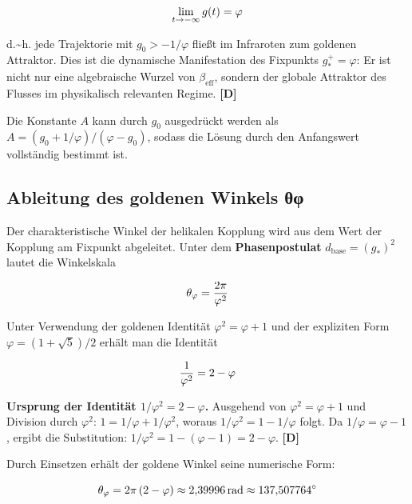 ﻿\documentclass[11pt,letterpaper]{article}
\begin{document}
\begin{equation*}
  \resizebox{\ifdim\width>\linewidth \linewidth\else\width\fi}{!}{$\displaystyle \lim_{t \to -\infty} g(t) = \varphi$}
\end{equation*}

d.\textasciitilde{}h. jede Trajektorie mit $g_0 > -1/\varphi$ fließt im Infraroten zum goldenen Attraktor. Dies ist die dynamische Manifestation des Fixpunkts $g_*^+ = \varphi$: Er ist nicht nur eine algebraische Wurzel von $\beta_{\text{eff}}$, sondern der globale Attraktor des Flusses im physikalisch relevanten Regime. \textbf{[D]}

Die Konstante $A$ kann durch $g_0$ ausgedrückt werden als $A = (g_0 + 1/\varphi)/(\varphi - g_0)$, sodass die Lösung durch den Anfangswert vollständig bestimmt ist.
\subsection{Ableitung des goldenen Winkels θφ}
Der charakteristische Winkel der helikalen Kopplung wird aus dem Wert der Kopplung am Fixpunkt abgeleitet. Unter dem \textbf{Phasenpostulat} $d_{\text{base}} = (g_*)^2$ lautet die Winkelskala

\begin{equation*}
  \resizebox{\ifdim\width>\linewidth \linewidth\else\width\fi}{!}{$\displaystyle \theta_\varphi = \frac{2\pi}{\varphi^2}$}
\end{equation*}

Unter Verwendung der goldenen Identität $\varphi^2 = \varphi + 1$ und der expliziten Form $\varphi = (1 + \sqrt{5})/2$ erhält man die Identität

\begin{equation*}
  \resizebox{\ifdim\width>\linewidth \linewidth\else\width\fi}{!}{$\displaystyle \frac{1}{\varphi^2} = 2 - \varphi$}
\end{equation*}

\textbf{Ursprung der Identität $1/\varphi^2 = 2 - \varphi$.} Ausgehend von $\varphi^2 = \varphi + 1$ und Division durch $\varphi^2$: $1 = 1/\varphi + 1/\varphi^2$, woraus $1/\varphi^2 = 1 - 1/\varphi$ folgt. Da $1/\varphi = \varphi - 1$, ergibt die Substitution: $1/\varphi^2 = 1 - (\varphi - 1) = 2 - \varphi$. \textbf{[D]}

Durch Einsetzen erhält der goldene Winkel seine numerische Form:

\begin{equation*}
  \resizebox{\ifdim\width>\linewidth \linewidth\else\width\fi}{!}{$\displaystyle \theta_\varphi = 2\pi\,(2 - \varphi) \approx 2{,}39996\,\text{rad} \approx 137{,}507764^\circ$}
\end{equation*}
\end{document}
